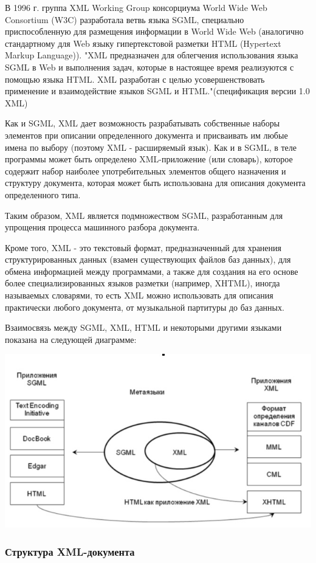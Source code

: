 \documentclass[12pt,a4paper,oneside]{article} %
\begin{document}
В 1996 г. группа XML Working Group консорциума World Wide Web Consortium (W3C) разработала ветвь языка SGML, специально приспособленную для размещения информации в World Wide Web (аналогично стандартному для Web языку гипертекстовой разметки HTML (Hypertext Markup Language)). "XML предназначен для облегчения использования языка SGML в Web и выполнения задач, которые в настоящее время реализуются с помощью языка HTML. XML разработан с целью усовершенствовать применение и взаимодействие языков SGML и HTML."(спецификация версии 1.0 XML)

Как и SGML, XML дает возможность разрабатывать собственные наборы элементов при описании определенного документа и присваивать им любые имена по выбору (поэтому XML - расширяемый язык). Как и в SGML, в теле программы может быть определено XML-приложение (или словарь), которое содержит набор наиболее употребительных элементов общего назначения и структуру документа, которая может быть использована для описания документа определенного типа.

Таким образом,  XML является подмножеством SGML, разработанным для упрощения процесса машинного разбора документа.

Кроме того, XML - это текстовый формат, предназначенный для хранения структурированных данных (взамен существующих файлов баз данных), для обмена информацией между программами, а также для создания на его основе более специализированных языков разметки (например, XHTML), иногда называемых словарями, то есть XML можно использовать для описания практически любого документа, от музыкальной партитуры до баз данных.

Взаимосвязь между SGML, XML, HTML и некоторыми другими языками показана на следующей диаграмме:

\includegraphics[width=0.85\linewidth]{07-01}

\newpage
\subsubsection{Структура XML-документа}	
\end{document}
